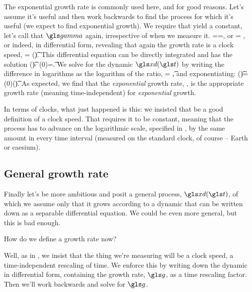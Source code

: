 The exponential growth rate is commonly used here, and for good reasons. Let's assume it's useful and then work backwards to find the process for which it's useful (we expect to find exponential growth). We require that  yield a constant, let's call that $\ggamma$ again, irrespective of when we measure it.
\be
 \gexp=\frac{\D \ln \xd}{\Dt}=\ggamma,
\ee
or
\be
\D \ln \xd = \ggamma\Dt,
\ee
or indeed, in differential form, revealing that again the growth rate is a clock speed,
\be
\gd\ln \xd = \gd(\ggamma \t).
\ee
This differential equation can be directly integrated and has the solution
\be
\ln \xd(\t)- \ln \xd(0)=\ggamma \t.
\ee
We solve for the dynamic $\xd(\t)$ by writing the difference in logarithms as the logarithm of the ratio,
\be
\ln {} = \ggamma \t ,
\ee
and exponentiating:
\be
\xd(\t)=\xd(0)\exp(\ggamma \t).
\ee
As expected, we find that the {\it exponential} growth rate, , is the appropriate 
growth rate (meaning time-independent) for {\it exponential} growth.

In terms of clocks, what just happened is this: we insisted that  be a good 
definition of a clock speed. That requires it to be constant, meaning that the process has 
to advance on the logarithmic scale, specified in , by the same amount in 
every time interval (measured on the standard clock, of course -- Earth or caesium).

\subsection{General growth rate}

Finally let's be more ambitious and posit a general process, $\xd(\t)$, of which we assume only that it grows according to a dynamic that can be written down as a separable differential equation. We could be even more general, but this is bad enough.

How do we define a growth rate now?

Well, as in , we insist that the thing we're measuring will be a clock speed, \ie a 
time-independent rescaling of time. We enforce this by writing down the dynamic in differential 
form, containing the growth rate, $\g$, as a time rescaling factor. Then we'll work backwards and solve 
for $\g$.

